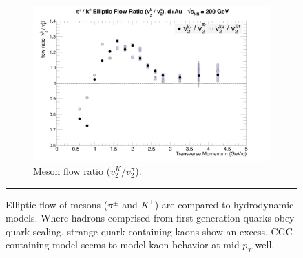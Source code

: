 \begin{figure}[hbtp]
\begin{subfigure}[h]{0.48\textwidth}
	\end{subfigure}
	\begin{subfigure}[h]{0.48\textwidth}
    \centering
    \includegraphics[width=1\textwidth]{results/v2mesonratio.jpg}
    \caption{Meson flow ratio ($v_2^{K} / v_2^{\pi}$).}
    \label{fig:mesonratio}

	\end{subfigure}

    \rule{35em}{0.5pt}
    \caption[Meson Elliptic Flow plots]{Elliptic flow of mesons ($\pi^{\pm}$ and $K^{\pm}$) are compared to hydrodynamic models. Where hadrons comprised from first generation quarks obey quark scaling, strange quark-containing kaons show an excess. CGC containing model seems to model kaon behavior at mid-$p_T$ well.}
    \label{fig:qscaledhydro}
\end{figure}

